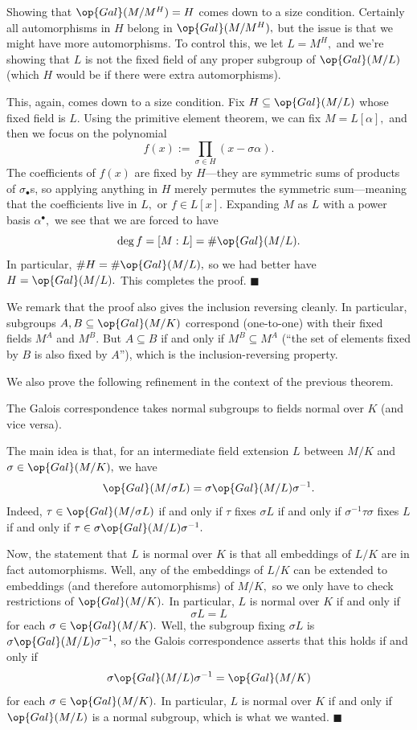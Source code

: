 Showing that $\op{Gal}(M/M^H)=H$ comes down to a size condition. Certainly all automorphisms in $H$ belong in $\op{Gal}(M/M^H),$ but the issue is that we might have more automorphisms. To control this, we let $L=M^H,$ and we're showing that $L$ is not the fixed field of any proper subgroup of $\op{Gal}(M/L)$ (which $H$ would be if there were extra automorphisms).

This, again, comes down to a size condition. Fix $H\subseteq\op{Gal}(M/L)$ whose fixed field is $L.$ Using the primitive element theorem, we can fix $M=L[\alpha],$ and then we focus on the polynomial
\[f(x):=\prod_{\sigma\in H}(x-\sigma\alpha).\]
The coefficients of $f(x)$ are fixed by $H$---they are symmetric sums of products of $\sigma_\bullet$s, so applying anything in $H$ merely permutes the symmetric sum---meaning that the coefficients live in $L,$ or $f\in L[x].$ Expanding $M$ as $L$ with a power basis $\alpha^\bullet,$ we see that we are forced to have
\[\deg f=[M:L]=\#\op{Gal}(M/L).\]
In particular, $\#H=\#\op{Gal}(M/L),$ so we had better have $H=\op{Gal}(M/L).$ This completes the proof. $\blacksquare$

We remark that the proof also gives the inclusion reversing cleanly. In particular, subgroups $A,B\subseteq\op{Gal}(M/K)$ correspond (one-to-one) with their fixed fields $M^A$ and $M^B.$ But $A\subseteq B$ if and only if $M^B\subseteq M^A$ (``the set of elements fixed by $B$ is also fixed by $A$''), which is the inclusion-reversing property.

We also prove the following refinement in the context of the previous theorem.
\begin{theorem}
    The Galois correspondence takes normal subgroups to fields normal over $K$ (and vice versa).
\end{theorem}
The main idea is that, for an intermediate field extension $L$ between $M/K$ and $\sigma\in\op{Gal}(M/K),$ we have
\[\op{Gal}(M/\sigma L)=\sigma\op{Gal}(M/L)\sigma^{-1}.\]
Indeed, $\tau\in\op{Gal}(M/\sigma L)$ if and only if $\tau$ fixes $\sigma L$ if and only if $\sigma^{-1}\tau\sigma$ fixes $L$ if and only if $\tau\in\sigma\op{Gal}(M/L)\sigma^{-1}.$

Now, the statement that $L$ is normal over $K$ is that all embeddings of $L/K$ are in fact automorphisms. Well, any of the embeddings of $L/K$ can be extended to embeddings (and therefore automorphisms) of $M/K,$ so we only have to check restrictions of $\op{Gal}(M/K).$ In particular, $L$ is normal over $K$ if and only if
\[\sigma L=L\]
for each $\sigma\in\op{Gal}(M/K).$ Well, the subgroup fixing $\sigma L$ is $\sigma\op{Gal}(M/L)\sigma^{-1},$ so the Galois correspondence asserts that this holds if and only if
\[\sigma\op{Gal}(M/L)\sigma^{-1}=\op{Gal}(M/K)\]
for each $\sigma\in\op{Gal}(M/K).$ In particular, $L$ is normal over $K$ if and only if $\op{Gal}(M/L)$ is a normal subgroup, which is what we wanted. $\blacksquare$

